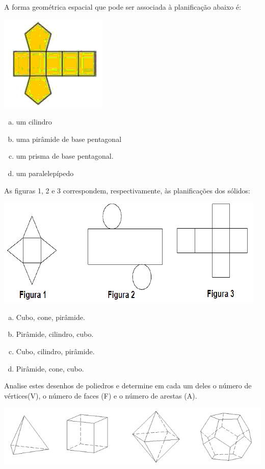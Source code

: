 \item A forma geométrica espacial que pode ser associada à planificação abaixo é:
\begin{multicols}{2}
	\includegraphics[scale=0.7]{figuras/fig81.png}
	\begin{enumerate}[a)]
		\item um cilindro
		\item uma pirâmide de base pentagonal 
		\item um prisma de base pentagonal.
		\item um paralelepípedo	
	\end{enumerate}
\end{multicols}

\item As figuras 1, 2 e 3 correspondem, respectivamente, às planificações dos sólidos:
\begin{center}
\includegraphics[scale=0.6]{figuras/fig82.png}
\end{center}
\begin{multicols}{4}
\begin{enumerate}[a)]
	\item Cubo, cone, pirâmide.
	\item Pirâmide, cilindro, cubo.
	\item Cubo, cilindro, pirâmide.
	\item Pirâmide, cone, cubo.
\end{enumerate}
\end{multicols}
\item Analise estes desenhos de poliedros e determine em cada um deles o número de vértices(V), o número de faces (F) e o número de arestas (A).
\begin{center}
\includegraphics[scale=0.9]{figuras/fig83.png}
\end{center}

